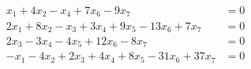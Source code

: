 \begin{align*}
x_1 +4x_2  - x_4  + 7x_6 - 9x_7 &= 0\\
2x_1 + 8x_2 - x_3 + 3x_4 + 9x_5 - 13x_6 + 7x_7 &= 0\\
 2x_3 -3x_4 -4x_5 +12x_6 -8x_7 &= 0\\
-x_1  - 4x_2 + 2x_3 +4x_4 + 8x_5 - 31x_6 + 37x_7 &= 0
\end{align*}